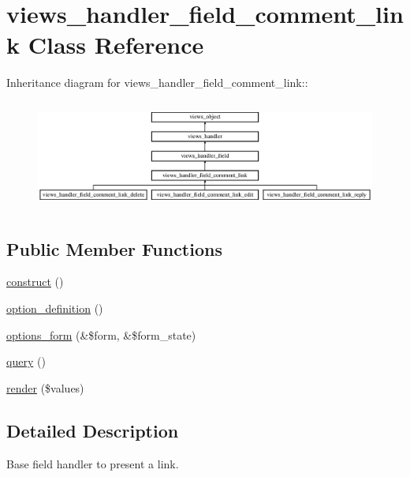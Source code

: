 \hypertarget{classviews__handler__field__comment__link}{
\section{views\_\-handler\_\-field\_\-comment\_\-link Class Reference}
\label{classviews__handler__field__comment__link}
}
Inheritance diagram for views\_\-handler\_\-field\_\-comment\_\-link::\begin{figure}[H]
\begin{center}
\leavevmode
\includegraphics[height=3.64583cm]{classviews__handler__field__comment__link}
\end{center}
\end{figure}
\subsection*{Public Member Functions}
\begin{CompactItemize}
\item 
\hyperlink{classviews__handler__field__comment__link_11c7fcae5ff5f91fa48fc1581115869b}{construct} ()
\item 
\hyperlink{classviews__handler__field__comment__link_9f066947db597494928b57423b1b7d30}{option\_\-definition} ()
\item 
\hyperlink{classviews__handler__field__comment__link_82957426a30584198c79c78804265bdc}{options\_\-form} (\&\$form, \&\$form\_\-state)
\item 
\hyperlink{classviews__handler__field__comment__link_c19c2cedce77bfa9490624df9cd1eac2}{query} ()
\item 
\hyperlink{classviews__handler__field__comment__link_c5e8317cc1a0b2a7688f865662b27dae}{render} (\$values)
\end{CompactItemize}


\subsection{Detailed Description}
Base field handler to present a link. 

